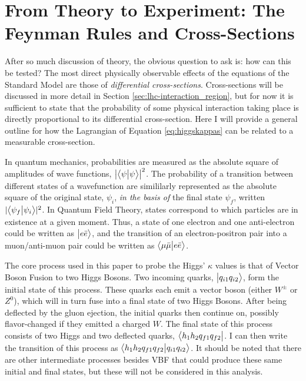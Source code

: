 \section{From Theory to Experiment: The Feynman Rules and Cross-Sections}
    
    After so much discussion of theory, the obvious question to ask is: how can this be tested?
    The most direct physically observable effects of the equations of the Standard Model are those of \textit{differential cross-sections}.
    Cross-sections will be discussed in more detail in Section \ref{sec:lhc-interaction_region},
        but for now it is sufficient to state that the probability of some physical interaction taking place
        is directly proportional to its differential cross-section.
    Here I will provide a general outline for how the Lagrangian of Equation \ref{eq:higgskappas} can be related to a measurable cross-section.

    In quantum mechanics, probabilities are measured as the absolute square of amplitudes of wave functions, $\left|\big< \psi \big| \psi \big>\right|^2$.
    The probability of a transition between different states of a wavefunction are simililarly represented
        as the absolute square of the original state, $\psi_i$, \textit{in the basis of} the final state $\psi_f$,
        written $ |\big< \psi_f \big| \psi_i \big>|^2$.
    In Quantum Field Theory, states correspond to which particles are in existence at a given moment.
    Thus, a state of one electron and one anti-electron could be written as $\big| e \bar{e} \big>$,
        and the transition of an electron-positron pair into a muon/anti-muon pair could be written
        as $\big< \mu \bar{\mu} \big| e \bar{e} \big>$.

    The core process used in this paper to probe the Higgs' $\kappa$ values is that of Vector Boson Fusion to two Higgs Bosons.
    Two incoming quarks, $\big| q_{i1} q_{i2} \big>$, form the initial state of this process.
    These quarks each emit a vector boson (either $W^{\pm}$ or $Z^0$), 
        which will in turn fuse into a final state of two Higgs Bosons.
    After being deflected by the gluon ejection, the initial quarks then continue on, possibly flavor-changed if they emitted a charged $W$.
    The final state of this process consists of two Higgs and two deflected quarks, $\big< h_1 h_2 q_{f1} q_{f2} \big|$.
    I can then write the transition of this process as $\big<  h_1 h_2 q_{f1} q_{f2} \big| q_{i1} q_{i2} \big>$.
    It should be noted that there are other intermediate processes besides VBF
        that could produce these same initial and final states, 
        but these will not be considered in this analysis.

